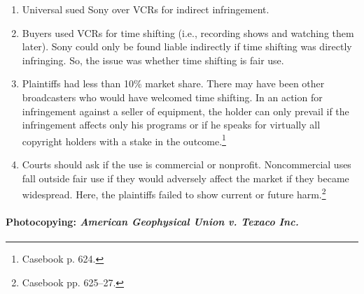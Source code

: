 \begin{enumerate}
    \item Universal sued Sony over VCRs for indirect infringement.
    \item Buyers used VCRs for time shifting (i.e., recording shows and 
    watching them later). Sony could only be found liable indirectly if time 
    shifting was directly infringing. So, the issue was whether time shifting 
    is fair use.
    \item Plaintiffs had less than 10\% market share. There may have been 
    other broadcasters who would have welcomed time shifting. In an action for 
    infringement against a seller of equipment, the holder can only prevail if 
    the infringement affects only his programs or if he speaks for virtually 
    all copyright holders with a stake in the outcome.\footnote{Casebook p. 
    624.}
    \item Courts should ask if the use is commercial or nonprofit. 
    Noncommercial uses fall outside fair use if they would adversely affect 
    the market if they became widespread. Here, the plaintiffs failed to show 
    current or future harm.\footnote{Casebook pp. 625--27.}
\end{enumerate}

\paragraph{Photocopying: \emph{American Geophysical Union v. Texaco Inc.}}

